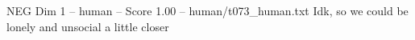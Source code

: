 \begin{textsample}{NEG Dim 1 – human – Score 1.00 – human/t073\_human.txt}  \label{ex:f1_neg_009}
Idk, so we could be lonely and unsocial a little closer

\end{textsample}
